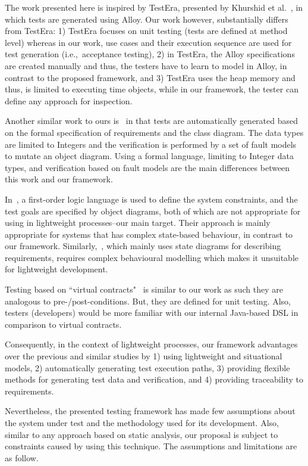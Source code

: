 %
%
\label{sec:discussion}
The work presented here is inspired by TestEra, presented by Khurshid et al.~\cite{Khurshid2004}, in which tests are generated using Alloy. Our work however, substantially differs from TestEra: 1) TestEra focuses on unit testing (tests are defined at method level) whereas in our work, use cases and their execution sequence are used for test generation (i.e.,\ acceptance testing), 2) in TestEra, the Alloy specifications are created manually and thus, the testers have to learn to model in Alloy, in contrast to the proposed framework, and 3) TestEra uses the heap memory and thus, is limited to executing time objects, while in our framework, the tester can define any approach for inspection.

Another similar work to ours is~\cite{Kaplan2008} in that tests are automatically generated based on the formal specification of requirements and the class diagram. The data types are limited to Integers and the verification is performed by a set of fault models to mutate an object diagram. Using a formal language, limiting to Integer data types, and verification based on fault models are the main differences between this work and our framework.

In~\cite{Scheetz1999}, a first-order logic language is used to define the system constraints, and the test goals are specified by object diagrams, both of which are not appropriate for using in lightweight processes--our main target. Their approach is mainly appropriate for systems that has complex state-based behaviour, in contrast to our framework.
Similarly,~\cite{Cavarra2002}, which mainly uses state diagrams for describing requirements, requires complex behavioural modelling which makes it unsuitable for lightweight development.

Testing based on ``virtual contracts"~\cite{Engels2006} is similar to our work as such they are analogous to pre-/post-conditions. But, they are defined for unit testing. Also, testers (developers) would be more familiar with our internal Java-based DSL in comparison to virtual contracts.

Consequently, in the context of lightweight processes, our framework advantages over the previous and similar studies by 1) using lightweight and situational models, 2) automatically generating test execution paths, 3) providing flexible methods for generating test data and verification, and 4) providing traceability to requirements.

Nevertheless, the presented testing framework has made few assumptions about the system under test and the methodology used for its development. Also, similar to any approach based on static analysis, our proposal is subject to constraints caused by using this technique. The assumptions and limitations are as follow.


